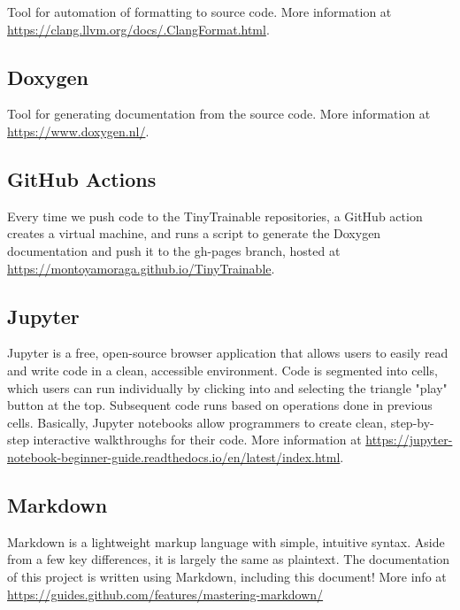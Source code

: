 Tool for automation of formatting to source code. More information at \url{https://clang.llvm.org/docs/.ClangFormat.html}.

\subsection{Doxygen}

Tool for generating documentation from the source code. More information at \url{https://www.doxygen.nl/}.

\subsection{GitHub Actions}

Every time we push code to the TinyTrainable repositories, a GitHub action creates a virtual machine, and runs a script to generate the Doxygen documentation and push it to the gh-pages branch, hosted at \url{https://montoyamoraga.github.io/TinyTrainable}.

\subsection{Jupyter}

Jupyter is a free, open-source browser application that allows users to easily read and write code in a clean, accessible environment. Code is segmented into cells, which users can run individually by clicking into and selecting the triangle "play" button at the top. Subsequent code runs based on operations done in previous cells. Basically, Jupyter notebooks allow programmers to create clean, step-by-step interactive walkthroughs for their code. More information at \url{https://jupyter-notebook-beginner-guide.readthedocs.io/en/latest/index.html}.

\subsection{Markdown}

Markdown is a lightweight markup language with simple, intuitive syntax. Aside from a few key differences, it is largely the same as plaintext. The documentation of this project is written using Markdown, including this document! More info at \url{https://guides.github.com/features/mastering-markdown/}
